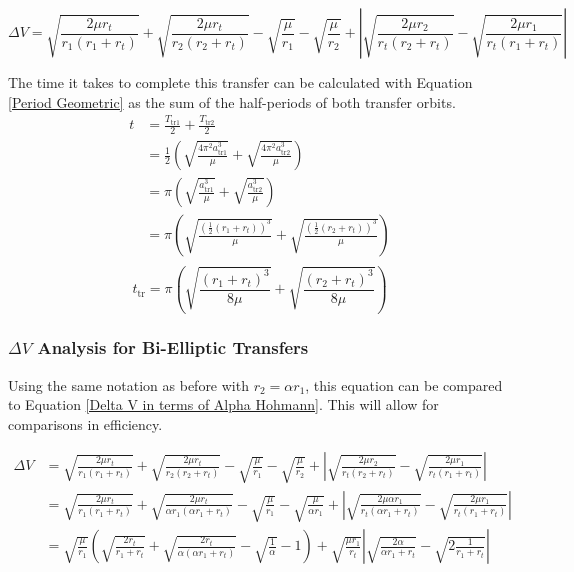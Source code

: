 \documentclass{article}
\begin{document}
\begin{equation}
    \Delta V = \sqrt{\frac{2\mu r_t}{r_1(r_1+r_t)}}+\sqrt{\frac{2\mu r_t}{r_2(r_2+r_t)}}-\sqrt{\frac{\mu}{r_1}}-\sqrt{\frac{\mu}{r_2}}+\left|\sqrt{\frac{2\mu r_2}{r_t(r_2+r_t)}}-\sqrt{\frac{2\mu r_1}{r_t(r_1+r_t)}}\right|
\end{equation}

The time it takes to complete this transfer can be calculated with Equation \eqref{Period Geometric} as the sum of the half-periods of both transfer orbits.
\begin{align*}
    t & =\frac{T_\text{tr1}}{2}+\frac{T_\text{tr2}}{2}                                                             \\
      & =\frac{1}{2}\left(\sqrt{\frac{4\pi^2 a_\text{tr1}^3}{\mu}}+\sqrt{\frac{4\pi^2 a_\text{tr2}^3}{\mu}}\right) \\
      & =\pi\left(\sqrt{\frac{a_\text{tr1}^3}{\mu}}+\sqrt{\frac{a_\text{tr2}^3}{\mu}}\right)                       \\
      & =\pi\left(\sqrt{\frac{(\frac{1}{2}(r_1+r_t))^3}{\mu}}+\sqrt{\frac{(\frac{1}{2}(r_2+r_t))^3}{\mu}}\right)   \\
\end{align*}
\begin{equation}\label{Bielliptic time}
    t_\text{tr}=\pi\left(\sqrt{\frac{(r_1+r_t)^3}{8\mu}}+\sqrt{\frac{(r_2+r_t)^3}{8\mu}}\right)
\end{equation}

\subsubsection{\texorpdfstring{$\Delta V$}{DeltaV} Analysis for Bi-Elliptic Transfers}

Using the same notation as before with $r_2=\alpha r_1$, this equation can be compared to Equation \eqref{Delta V in terms of Alpha Hohmann}. This will allow for comparisons in efficiency.

\begin{align*}
    \Delta V & = \sqrt{\frac{2\mu r_t}{r_1(r_1+r_t)}}+\sqrt{\frac{2\mu r_t}{r_2(r_2+r_t)}}-\sqrt{\frac{\mu}{r_1}}-\sqrt{\frac{\mu}{r_2}}+\left|\sqrt{\frac{2\mu r_2}{r_t(r_2+r_t)}}-\sqrt{\frac{2\mu r_1}{r_t(r_1+r_t)}}\right|                                    \\
             & = \sqrt{\frac{2\mu r_t}{r_1(r_1+r_t)}}+\sqrt{\frac{2\mu r_t}{\alpha r_1(\alpha r_1+r_t)}}-\sqrt{\frac{\mu}{r_1}}-\sqrt{\frac{\mu}{\alpha r_1}}+\left|\sqrt{\frac{2\mu \alpha r_1}{r_t(\alpha r_1+r_t)}}-\sqrt{\frac{2\mu r_1}{r_t(r_1+r_t)}}\right| \\
             & = \sqrt{\frac{\mu}{r_1}}\left(\sqrt{\frac{2r_t}{r_1+r_t}}+\sqrt{\frac{2r_t}{\alpha(\alpha r_1+r_t)}}-\sqrt{\frac{1}{\alpha}}-1\right)+\sqrt{\frac{\mu r_1}{r_t}}\left|\sqrt{\frac{2\alpha}{\alpha r_1+r_t}}-\sqrt{2\frac{1}{r_1+r_t}}\right|
\end{align*}
\end{document}
